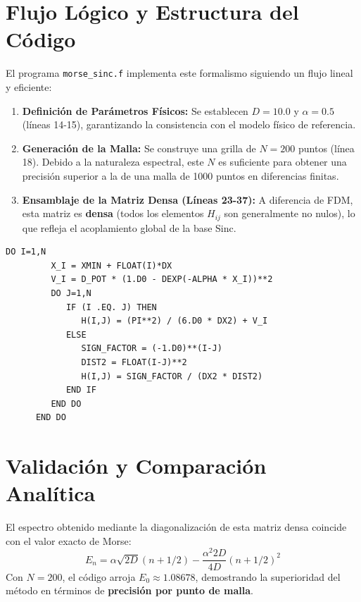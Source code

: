 \documentclass[12pt,a4paper]{article}
\begin{document}
\section{Flujo Lógico y Estructura del Código}
El programa \texttt{morse\_sinc.f} implementa este formalismo siguiendo un flujo lineal y eficiente:

\begin{enumerate}
    \item \textbf{Definición de Parámetros Físicos:} Se establecen $D = 10.0$ y $\alpha = 0.5$ (líneas 14-15), garantizando la consistencia con el modelo físico de referencia.
    \item \textbf{Generación de la Malla:} Se construye una grilla de $N=200$ puntos (línea 18). Debido a la naturaleza espectral, este $N$ es suficiente para obtener una precisión superior a la de una malla de 1000 puntos en diferencias finitas.
    \item \textbf{Ensamblaje de la Matriz Densa (Líneas 23-37):} A diferencia de FDM, esta matriz es \textbf{densa} (todos los elementos $H_{ij}$ son generalmente no nulos), lo que refleja el acoplamiento global de la base Sinc.
\end{enumerate}

\begin{lstlisting}[caption={Implementación de la matriz Hamiltoniana Sinc-DVR}]
      DO I=1,N
         X_I = XMIN + FLOAT(I)*DX
         V_I = D_POT * (1.D0 - DEXP(-ALPHA * X_I))**2
         DO J=1,N
            IF (I .EQ. J) THEN
               H(I,J) = (PI**2) / (6.D0 * DX2) + V_I
            ELSE
               SIGN_FACTOR = (-1.D0)**(I-J)
               DIST2 = FLOAT(I-J)**2
               H(I,J) = SIGN_FACTOR / (DX2 * DIST2)
            END IF
         END DO
      END DO
\end{lstlisting}

\section{Validación y Comparación Analítica}
El espectro obtenido mediante la diagonalización de esta matriz densa coincide con el valor exacto de Morse:
\begin{equation}
E_n = \alpha\sqrt{2D}(n + 1/2) - \frac{\alpha^2 2D}{4D}(n + 1/2)^2
\end{equation}
Con $N=200$, el código arroja $E_0 \approx 1.08678$, demostrando la superioridad del método en términos de \textbf{precisión por punto de malla}.
\end{document}
